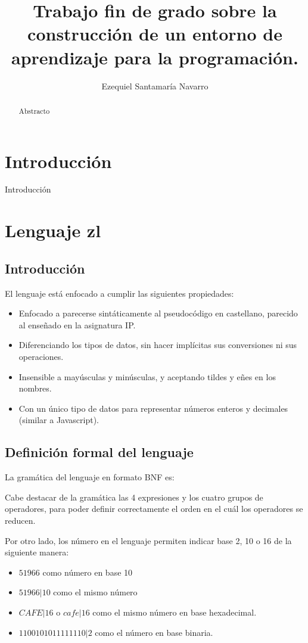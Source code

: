 \documentclass{report}
\author{Ezequiel Santamaría Navarro}
\title{Trabajo fin de grado sobre la construcción de un entorno de aprendizaje para la programación.}
\begin{document}
\maketitle
\tableofcontents
	
\begin{abstract}
	Abstracto
\end{abstract}


\chapter{Introducción}
Introducción

\chapter{Lenguaje zl}
\section{Introducción}
El lenguaje está enfocado a cumplir las siguientes propiedades:

\begin{itemize}
	\item Enfocado a parecerse sintáticamente al pseudocódigo en castellano, parecido al enseñado en la asignatura IP.
	\item Diferenciando los tipos de datos, sin hacer implícitas sus conversiones ni sus operaciones.
	\item Insensible a mayúsculas y minúsculas, 
	y aceptando tildes y eñes en los nombres.
	\item Con un único tipo de datos para representar números enteros y decimales (similar a Javascript).
\end{itemize}

\section{Definición formal del lenguaje}
La gramática del lenguaje en formato BNF es:


Cabe destacar de la gramática las 4 expresiones y los cuatro grupos de operadores, para poder definir correctamente el orden en el cuál los operadores se reducen.

Por otro lado, los número en el lenguaje permiten indicar base 2, 10 o 16 de la siguiente manera:

\begin{itemize}
	\item $51966$ como número en base 10
	\item $51966|10$ como el mismo número
	\item $CAFE|16$ o $cafe|16$ como el mismo número en base hexadecimal.
	\item $1100101011111110|2$ como el número en base binaria.
\end{itemize}
\end{document}
